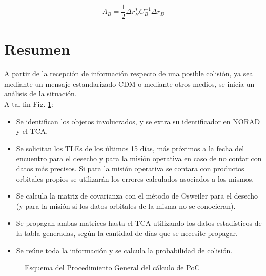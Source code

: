 \begin{equation}
A_{B}=\frac{1}{2}\Delta r^{T}_{B} C^{-1}_{B} \Delta r_{B}
\end{equation}

\section*{Resumen}
A partir de la recepci\'on de informaci\'on respecto de una posible colisi\'on, ya sea mediante un mensaje estandarizado CDM o mediante otros medios, se inicia un an\'alisis de la situaci\'on.\\
A tal fin Fig. \ref{fig:flujomain}:\\
\begin{itemize}
\itemsep0em
\item Se identifican los objetos involucrados, y se extra su identificador en NORAD y el TCA.
\item Se solicitan los TLEs de los \'ultimos 15 d\'ias, m\'as pr\'oximos a la fecha del encuentro para el desecho y para la misi\'on operativa en caso de no contar con datos m\'as precisos. Si para la misi\'on operativa se contara con productos orbitales propios se utilizar\'an los errores calculados asociados a los mismos.
\item Se calcula la matriz de covarianza con el m\'etodo de Osweiler para el desecho (y para la misi\'on si los datos orbitales de la misma no se conocieran).
\item Se propagan ambas matrices hasta el TCA utilizando los datos estad\'isticos de la tabla generadas, seg\'un la cantidad de d\'ias que se necesite propagar.
\item Se re\'une toda la informaci\'on y se calcula la probabilidad de colisi\'on.
\end{itemize}

\begin{figure}[!h]
\centering
{}
\caption[Esquema del Procedimiento General del c\'alculo de PoC]{Esquema del Procedimiento General del c\'alculo de PoC}
\label{fig:flujomain}
\end{figure}

\endinput